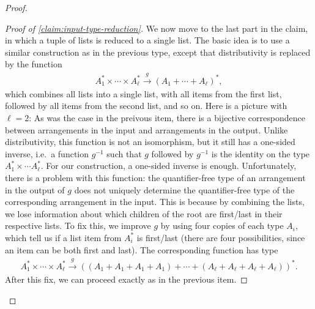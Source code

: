 \begin{proof}
\begin{proof}[Proof of \cref{claim:input-type-reduction}]
We now move to the last part in the claim, in which a tuple of lists is reduced to a single list. The basic idea is to use a similar construction as in the previous type, except that distributivity is replaced by the function 
\begin{align*}
A_1^* \times \cdots \times A_\ell^* \xrightarrow g (A_1 + \cdots + A_\ell)^*,
\end{align*}
which combines all lists into a single list, with all items from the first list, followed by all items from the second list, and so on. Here is a picture with $\ell=2$:
As was the case in the preivous item, there is a bijective correspondence between arrangements in the input and arrangements in the output.
Unlike distributivity, this function is not an isomorphism, but it still has a one-sided inverse, i.e.~a function $g^{-1}$ such that $g$ followed by $g^{-1}$ is the identity on the type $A_1^* \times \cdots A_\ell^*$. For our construction, a one-sided inverse is enough. Unfortunately, there is a problem with this function: the quantifier-free type of an arrangement in the output of $g$ does not uniquely determine the  quantifier-free type of the corresponding arrangement in the input.  This is because by combining the lists, we lose information about which children of the root are first/last in their respective lists. To fix this, we improve $g$ by using four copies of each type $A_i$, which tell us if a list item from $A_i^*$ is first/last (there are four possibilities, since an item can be both first and last). The corresponding function has type 
\begin{align*}
A_1^* \times \cdots \times A_\ell^* \xrightarrow g ((A_1+ A_1+A_1+A_1) + \cdots + (A_\ell + A_\ell + A_\ell+ A_\ell))^*.
\end{align*}
After this fix, we can proceed exactly as in the previous item.
        \end{proof}
\end{proof}

